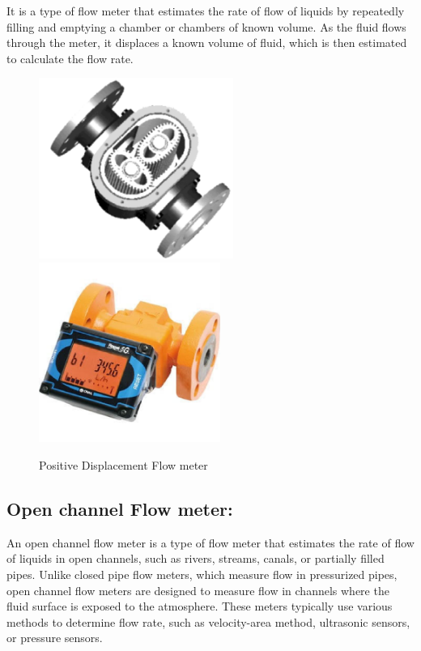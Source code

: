 It is a type of flow meter that estimates the rate of flow of liquids by
repeatedly filling and emptying a chamber or chambers of known volume.
As the fluid flows through the meter, it displaces a known volume of
fluid, which is then estimated to calculate the flow rate.

\begin{figure}[h!]
    \centering
    \includegraphics[width=2.50105in,height=2.32in]{figs/flowmeters/image20.png}
    \includegraphics[width=2.33107in,height=2.32in]{figs/flowmeters/image21.png}
    \caption{Positive Displacement Flow meter}
    \label{fig:Positive Displacement Flow meter}
\end{figure}

\subsection{Open channel Flow meter:}

An open channel flow meter is a type of flow meter that estimates the
rate of flow of liquids in open channels, such as rivers, streams,
canals, or partially filled pipes. Unlike closed pipe flow meters, which
measure flow in pressurized pipes, open channel flow meters are designed
to measure flow in channels where the fluid surface is exposed to the
atmosphere. These meters typically use various methods to determine flow
rate, such as velocity-area method, ultrasonic sensors, or pressure
sensors.


